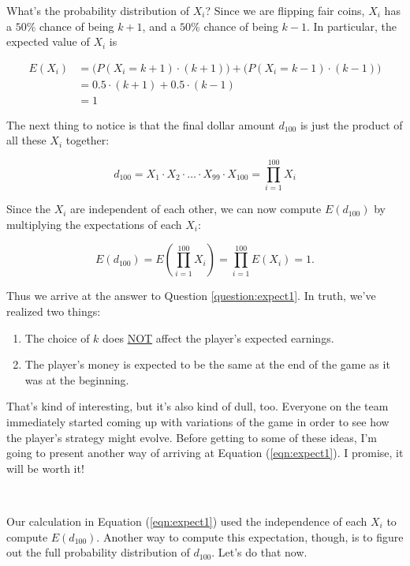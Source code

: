 \documentclass[12pt, oneside]{book}
\theoremstyle{plain}
\theoremstyle{definition}
\begin{document}
What's the probability distribution of $X_i$? Since we are flipping fair coins, $X_i$ has a $50\%$ chance of being $k+1$, and a $50\%$ chance of being $k-1$. In particular, the expected value of $X_i$ is

\begin{align*}
E(X_i) & = \bigg ( P(X_i = k+1) \cdot (k+1) \bigg ) + \bigg ( P(X_i = k-1) \cdot (k-1) \bigg ) \\
& = 0.5 \cdot (k+1) + 0.5 \cdot (k-1)\\
& = 1
\end{align*}

The next thing to notice is that the final dollar amount $d_{100}$ is just the product of all these $X_i$ together:

\[
d_{100} = X_1 \cdot X_2 \cdot \ldots \cdot X_{99} \cdot X_{100} = \prod_{i=1}^{100} X_i
\]

Since the $X_i$ are independent of each other, we can now compute $E(d_{100})$ by multiplying the expectations of each $X_i$:

\begin{equation}\label{eqn:expect1}
E(d_{100}) = E \left ( \prod_{i=1}^{100} X_i \right ) = \prod_{i=1}^{100} E(X_i) = 1.
\end{equation}

Thus we arrive at the answer to Question \ref{question:expect1}. In truth, we've realized two things:

\begin{enumerate}
\item The choice of $k$ does \underline{NOT} affect the player's expected earnings.
\item The player's money is expected to be the same at the end of the game as it was at the beginning.
\end{enumerate}

That's kind of interesting, but it's also kind of dull, too. Everyone on the team immediately started coming up with variations of the game in order to see how the player's strategy might evolve. Before getting to some of these ideas, I'm going to present another way of arriving at Equation (\ref{eqn:expect1}). I promise, it will be worth it!

\

Our calculation in Equation (\ref{eqn:expect1}) used the independence of each $X_i$ to compute $E(d_{100})$. Another way to compute this expectation, though, is to figure out the full probability distribution of $d_{100}$. Let's do that now.
\end{document}
